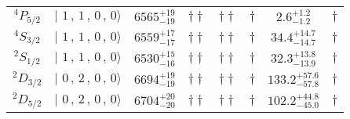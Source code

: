 \begin{tabular}{c| c c c c c c c}
$^{4}P_{5/2}$ & $\vert \,\,1\,,\,1\,,\,0\,,\,0 \rangle $ & $6565^{+19}_{-19}$ & $\dagger\dagger$ & $\dagger\dagger$ & $\dagger$ & $2.6^{+1.2}_{-1.2}$ & $\dagger$ \\ 
$^{4}S_{3/2}$ & $\vert \,\,1\,,\,1\,,\,0\,,\,0 \rangle $ & $6559^{+17}_{-17}$ & $\dagger\dagger$ & $\dagger\dagger$ & $\dagger$ & $34.4^{+14.7}_{-14.7}$ & $\dagger$ \\ 
$^{2}S_{1/2}$ & $\vert \,\,1\,,\,1\,,\,0\,,\,0 \rangle $ & $6530^{+15}_{-16}$ & $\dagger\dagger$ & $\dagger\dagger$ & $\dagger$ & $32.3^{+13.8}_{-13.9}$ & $\dagger$ \\ 
$^{2}D_{3/2}$ & $\vert \,\,0\,,\,2\,,\,0\,,\,0 \rangle $ & $6694^{+19}_{-19}$ & $\dagger\dagger$ & $\dagger\dagger$ & $\dagger$ & $133.2^{+57.6}_{-57.8}$ & $\dagger$ \\ 
$^{2}D_{5/2}$ & $\vert \,\,0\,,\,2\,,\,0\,,\,0 \rangle $ & $6704^{+20}_{-20}$ & $\dagger\dagger$ & $\dagger\dagger$ & $\dagger$ & $102.2^{+44.8}_{-45.0}$ & $\dagger$ \\ 
\hline \hline
\end{tabular}
